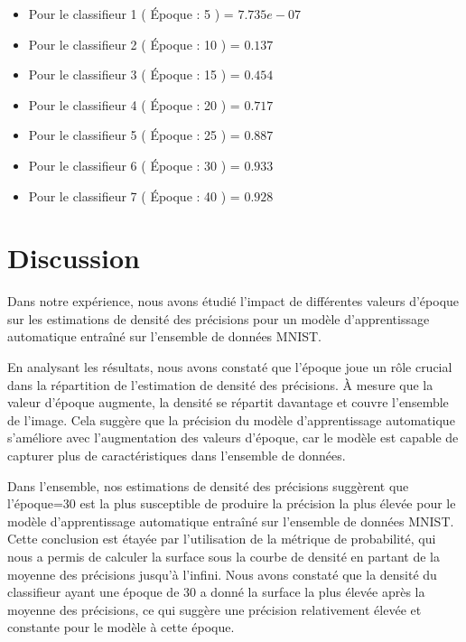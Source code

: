  \begin{itemize}
     \item Pour le classifieur 1 ( Époque : 5 ) = $7.735e-07$ 
      \vspace{0.25cm}

    \item Pour le classifieur 2 ( Époque : 10 ) = $0.137$
      \vspace{0.25cm}

     \item Pour le classifieur 3 ( Époque : 15 ) = $0.454$ 
      \vspace{0.25cm}

     \item Pour le classifieur 4 ( Époque : 20 ) = $0.717$ 
      \vspace{0.25cm}

     \item Pour le classifieur 5 ( Époque : 25 ) = $0.887$ 
      \vspace{0.25cm}

     \item Pour le classifieur 6 ( Époque : 30 ) = $0.933$ 
      \vspace{0.25cm}

     \item Pour le classifieur 7 ( Époque : 40 ) = $0.928$ 

 \end{itemize}





\clearpage
\section{Discussion}
Dans notre expérience, nous avons étudié l'impact de différentes valeurs d'époque sur les estimations de densité des précisions pour un modèle d'apprentissage automatique entraîné sur l'ensemble de données MNIST.

En analysant les résultats, nous avons constaté que l'époque joue un rôle crucial dans la répartition de l'estimation de densité des précisions. À mesure que la valeur d'époque augmente, la densité se répartit davantage et couvre l'ensemble de l'image. Cela suggère que la précision du modèle d'apprentissage automatique s'améliore avec l'augmentation des valeurs d'époque, car le modèle est capable de capturer plus de caractéristiques dans l'ensemble de données.

Dans l'ensemble, nos estimations de densité des précisions suggèrent que l'époque=30 est la plus susceptible de produire la précision la plus élevée pour le modèle d'apprentissage automatique entraîné sur l'ensemble de données MNIST. Cette conclusion est étayée par l'utilisation de la métrique de probabilité, qui nous a permis de calculer la surface sous la courbe de densité en partant de la moyenne des précisions jusqu'à l'infini. Nous avons constaté que la densité du classifieur ayant une époque de 30 a donné la surface la plus élevée après la moyenne des précisions, ce qui suggère une précision relativement élevée et constante pour le modèle à cette époque.

